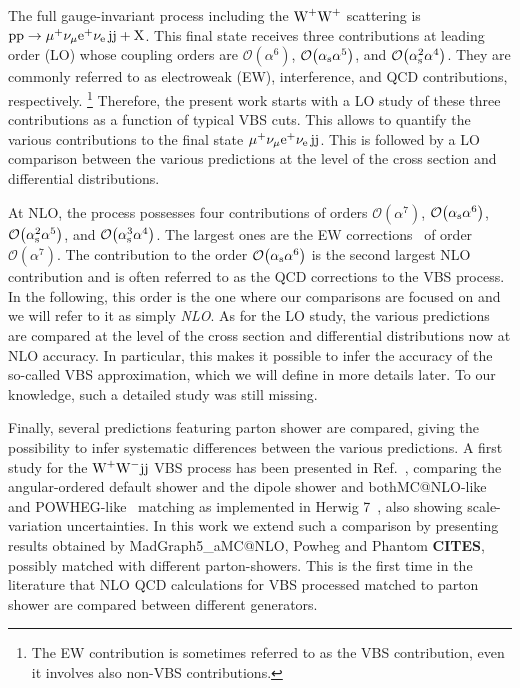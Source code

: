 The full gauge-invariant process including the $\text{W}^+\text{W}^+$ scattering 
 is $\text{p}\text{p}\to\mu^+\nu_\mu{\rm e}^+\nu_{\rm e}\,\text{j}\text{j}+\mathrm{X}$.
This final state receives three contributions at leading order (LO) whose coupling orders are $\mathcal{O}{\left(\alpha^{6}\right)}$, $\mathcal{O}{\left(\alpha_{\rm s}\alpha^{5}\right)}$, and $\mathcal{O}{\left(\alpha_\text{s}^{2}\alpha^{4}\right)}$.
They are commonly referred to as electroweak (EW), interference, and QCD contributions, respectively.%
\footnote{The EW contribution is sometimes referred to as the VBS contribution, even it involves also non-VBS contributions.}
Therefore, the present work starts with a LO study of these three contributions as a function of typical VBS cuts.
This allows to quantify the various contributions to the final state $\mu^+\nu_\mu{\rm e}^+\nu_{\rm e}\,\text{j}\text{j}$.
This is followed by a LO comparison between the various predictions at the level of the cross section and differential distributions.

At NLO, the process possesses four contributions of orders $\mathcal{O}{\left(\alpha^{7}\right)}$, $\mathcal{O}{\left(\alpha_\text{s}\alpha^{6}\right)}$, $\mathcal{O}{\left(\alpha_\text{s}^{2}\alpha^{5}\right)}$, and $\mathcal{O}{\left(\alpha_\text{s}^{3}\alpha^{4}\right)}$.
The largest ones are the EW corrections~\cite{Biedermann:2017bss,Biedermann:2016yds} of order $\mathcal{O}{\left(\alpha^{7}\right)}$.
The contribution to the order $\mathcal{O}{\left(\alpha_\text{s}\alpha^{6}\right)}$ is the second largest NLO contribution and is often referred to as the QCD corrections to the VBS process.
In the following, this order is the one where our comparisons are focused on and we will refer to it as simply \emph{NLO}.
As for the LO study, the various predictions are compared at the level of the cross section and differential distributions now at NLO accuracy.
In particular, this makes it possible to infer the accuracy of the so-called VBS approximation, which we will define in more details later.
To our knowledge, such a detailed study was still missing.

Finally, several predictions featuring parton shower are compared, giving the possibility to infer systematic differences between the various predictions.
A first study for the $\text{W}^+ \text{W}^- \text{j} \text{j}$ VBS process has been presented in
Ref.~\cite{Rauch:2016upa}, comparing the angular-ordered default shower and the dipole
shower and both{\sc MC@NLO}-like~\cite{Frixione:2002ik} and {\sc POWHEG}-like~\cite{Nason:2004rx,Frixione:2007vw} matching as implemented
in {\sc Herwig 7}~\cite{Bellm:2015jjp}, also showing scale-variation uncertainties. In this work we extend such a comparison by presenting 
results obtained by {\sc MadGraph5\_aMC@NLO}, {\sc Powheg} and {\sc Phantom} {\bf CITES}, possibly matched with different parton-showers.
This is the first time in the literature that NLO QCD calculations for VBS processed matched to parton shower are compared between different generators.

